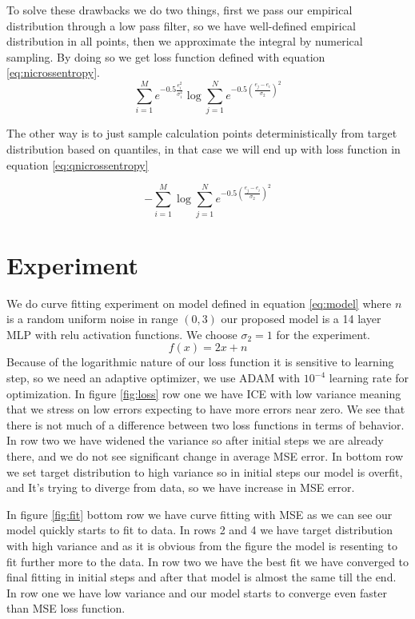 \documentclass[conference]{IEEEtran}
\begin{document}
To solve these drawbacks we do two things, first we pass our empirical distribution
through a low pass filter, so we have well-defined empirical distribution in all points,
then we approximate the integral by numerical sampling. By doing so we get loss function defined with equation \ref{eq:nicrossentropy}.
\begin{equation}
    \sum_{i=1}^{M}e^{-0.5\frac{e_i^2}{\sigma_1^2}} \log{\sum_{j = 1}^{N}e^{-0.5(\frac{e_j-e_i}{\sigma_2})^2}} 
    \label{eq:nicrossentropy}
\end{equation}

The other way is to just sample calculation points deterministically from target distribution
based on quantiles, in that case we will end up with loss function in 
equation \ref{eq:qnicrossentropy}

\begin{equation}
    -\sum_{i=1}^{M}\log{\sum_{j=1}^{N}e^{-0.5(\frac{e_j-e_i}{\sigma_2})^2}} 
    \label{eq:qnicrossentropy}
\end{equation}

\section{Experiment}
We do curve fitting experiment on model defined in equation \ref{eq:model} where $n$ is a random uniform 
noise in range $(0,  3)$ our proposed model is a 14 layer MLP with relu activation functions.
We choose $\sigma_2=1$ for the experiment.
\begin{equation}
    f(x) = 2x+n
    \label{eq:model}
\end{equation}
Because of the logarithmic nature of our loss function it is sensitive to learning step, so we need an adaptive optimizer,
we use ADAM with $10^{-4}$ learning rate for optimization. In figure \ref{fig:loss} row one 
we have ICE with low variance meaning that we stress on low errors expecting to have more errors
near zero. We see that there is not much of a difference between two loss functions in terms of behavior.
In row two we have widened the variance so after initial steps we are already there, and we  do not 
see significant change in average MSE error. In bottom row we set target distribution to high variance
so in initial steps our model is overfit, and It's trying to diverge from data, so we have increase
in MSE error.

In figure \ref{fig:fit} bottom row we have curve fitting with MSE as we can see our model quickly
starts to fit to data. In rows 2 and 4 we have target distribution with high variance and as it is
obvious from the figure the model is resenting to fit further more to the data. In row two we have the best
fit we have converged to final fitting in initial steps and after that model is almost the same till the end.
In row one we have low variance and our model starts to converge even faster than MSE loss function.
\end{document}
